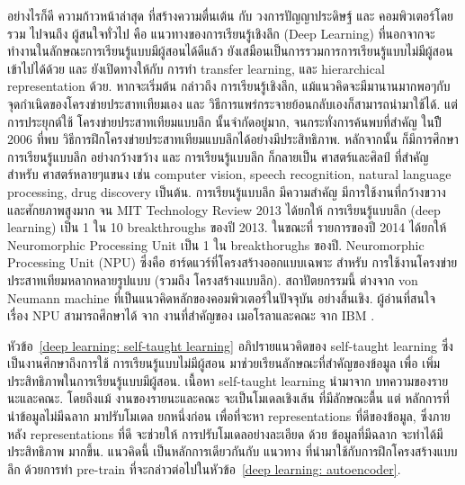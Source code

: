 อย่างไรก็ดี ความก้าวหน้าล่าสุด ที่สร้างความตื่นเต้น กับ วงการปัญญาประดิษฐ์ และ คอมพิวเตอร์โดยรวม ไปจนถึง ผู้สนใจทั่วไป คือ แนวทางของการเรียนรู้เชิงลึก (Deep Learning) ที่นอกจากจะทำงานในลักษณะการเรียนรู้แบบมีผู้สอนได้ดีแล้ว ยังเสมือนเป็นการรวมการการเรียนรู้แบบไม่มีผู้สอนเข้าไปได้ด้วย และ ยังเปิดทางให้กับ การทำ transfer learning, และ hierarchical representation ด้วย.
หากจะเริ่มต้น กล่าวถึง การเรียนรู้เชิงลึก, แม้แนวคิดจะมีมานานมากพอๆกับ จุดกำเนิดของโครงข่ายประสาทเทียมเอง และ วิธีการแพร่กระจายย้อนกลับเองก็สามารถนำมาใช้ได้.
แต่การประยุกต์ใช้ โครงข่ายประสาทเทียมแบบลึก นั้นจำกัดอยู่มาก, จนกระทั่งการค้นพบที่สำคัญ ในปีี 2006 \cite{HintonSalakhutdinov2006a} ที่พบ วิธีการฝึกโครงข่ายประสาทเทียมแบบลึกได้อย่างมีประสิทธิภาพ.
หลักจากนั้น ก็มีการศึกษา การเรียนรู้แบบลึก อย่างกว้างขว้าง และ การเรียนรู้แบบลึก ก็กลายเป็น ศาสตร์และศิลป์ ที่สำคัญ สำหรับ ศาสตร์หลายๆแขนง \cite{Jones2014a, Schmidhuber2015a,MNIST20150311,DahlSainathHinton2013a,DengEtAl2013a, 
ErhanEtAl2010a,CaetanoDosSantoEtAl2015,RamsundarEtAl2015,
ChenEtAl2014a,MaEtAl2015a,XiongEtAl2015a} เช่น computer vision, speech recognition, natural language processing, drug discovery เป็นต้น.
การเรียนรู้แบบลึก มีความสำคัญ มีการใช้งานที่กว้างขวาง และศักยภาพสูงมาก จน
MIT Technology Review 2013 ได้ยกให้ การเรียนรู้แบบลึก (deep learning) เป็น 1 ใน 10 breakthroughs ของปี 2013.
ในขณะที่ รายการของปี 2014 ได้ยกให้ Neuromorphic Processing Unit เป็น 1 ใน breakthorughs ของปี.
Neuromorphic Processing Unit (NPU) \cite{MerollaEtAl2014a} ซึ่งคือ ฮาร์ดแวร์ที่โครงสร้างออกแบบเฉพาะ สำหรับ การใช้งานโครงข่ายประสาทเทียมหลากหลายรูปแบบ (รวมถึง โครงสร้างแบบลึก).
สถาปัตยกรรมนี้ ต่างจาก von Neumann machine ที่เป็นแนวคิดหลักของคอมพิวเตอร์ในปัจจุบัน อย่างสิ้นเชิง.
ผู้อ่านที่สนใจ เรื่อง NPU สามารถศึกษาได้ จาก งานที่สำคัญของ เมอโรลาและคณะ จาก IBM \cite{MerollaEtAl2014a}.

หัวข้อ~\ref{deep learning: self-taught learning} อภิปรายแนวคิดของ self-taught learning ซึ่งเป็นงานศึกษาถึงการใช้ การเรียนรู้แบบไม่มีผู้สอน มาช่วยเรียนลักษณะที่สำคัญของข้อมูล เพื่อ เพิ่มประสิทธิภาพในการเรียนรู้แบบมีผู้สอน.
เนื้อหา self-taught learning นำมาจาก บทความของรายนะและคณะ\cite{RainaEtAl2007a}.
โดยถึงแม้ งานของรายนะและคณะ จะเป็นโมเดลเชิงเส้น ที่มีลักษณะตื้น แต่ หลักการที่ นำข้อมูลไม่มีฉลาก มาปรับโมเดล ยกหนึ่งก่อน เพื่อที่จะหา representations ที่ดีของข้อมูล,
ซึ่งภายหลัง representations ที่ดี จะช่วยให้ การปรับโมเดลอย่างละเอียด ด้วย ข้อมูลที่มีฉลาก จะทำได้มีประสิทธิภาพ มากขึ้น.
แนวคิดนี้ เป็นหลักการเดียวกันกับ แนวทาง ที่นำมาใช้กับการฝึกโครงสร้างแบบลึก ด้วยการทำ pre-train ที่จะกล่าวต่อไปในหัวข้อ~\ref{deep learning: autoencoder}.

